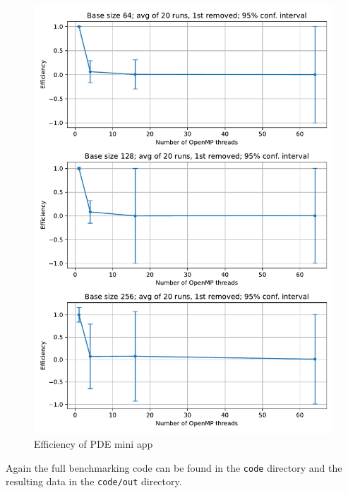 \documentclass[unicode,11pt,a4paper,oneside,numbers=endperiod,openany]{scrartcl}
\begin{document}
\begin{figure}[h!t]
    \includegraphics[width=\textwidth]{plots/weak_efficiency.pdf}
    \caption{Efficiency of PDE mini app}
    \label{fig:weak_efficiency}
\end{figure}

Again the full benchmarking code can be found in the \texttt{code} directory and the resulting data in the \texttt{code/out} directory.
\end{document}
